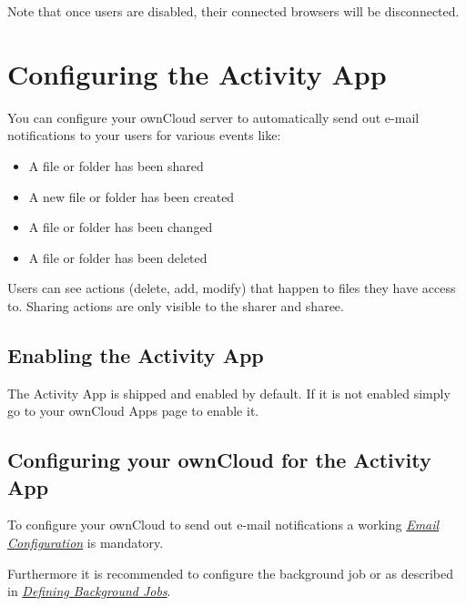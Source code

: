 \documentclass[letterpaper,10pt,english]{sphinxmanual}
\begin{document}
Note that once users are disabled, their connected browsers will be disconnected.


\section{Configuring the Activity App}
\label{configuration_server/activity_configuration::doc}\label{configuration_server/activity_configuration:configuring-the-activity-app}
You can configure your ownCloud server to automatically send out e-mail notifications
to your users for various events like:
\begin{itemize}
\item {} 
A file or folder has been shared

\item {} 
A new file or folder has been created

\item {} 
A file or folder has been changed

\item {} 
A file or folder has been deleted

\end{itemize}

Users can see actions (delete, add, modify) that happen to files they have access to.
Sharing actions are only visible to the sharer and sharee.


\subsection{Enabling the Activity App}
\label{configuration_server/activity_configuration:enabling-the-activity-app}
The Activity App is shipped and enabled by default. If it is not enabled
simply go to your ownCloud Apps page to enable it.


\subsection{Configuring your ownCloud for the Activity App}
\label{configuration_server/activity_configuration:configuring-your-owncloud-for-the-activity-app}
To configure your ownCloud to send out e-mail notifications a working
{\hyperref[configuration_server/email_configuration::doc]{\emph{\emph{Email Configuration}}}} is mandatory.

Furthermore it is recommended to configure the background job  or
 as described in {\hyperref[configuration_server/background_jobs_configuration::doc]{\emph{\emph{Defining Background Jobs}}}}.
\end{document}
